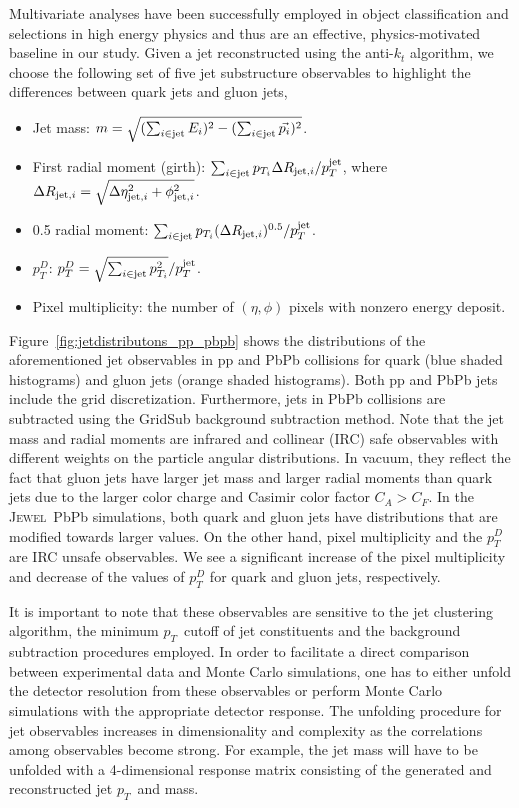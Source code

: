 \documentclass[notoc,preprintnumbers]{JHEP3}
\newcommand{\pt}{$p_{T}$}
\newcommand{\jw}{\textsc{Jewel}~}
\begin{document}
Multivariate analyses have been successfully employed in object classification and selections in high energy physics \cite{Bhat:2010zz, 1742-6596-608-1-012058} and thus are an effective, physics-motivated baseline in our study. Given a jet reconstructed using the anti-$k_{t}$ algorithm, we choose the following set of five jet substructure observables \cite{Gallicchio:2012ez} to highlight the differences between quark jets and gluon jets,
	\begin{itemize}
		\item Jet mass: $m = \sqrt{(\sum_{i\in {\rm jet}} E_i)^{2} - (\sum_{i\in {\rm jet}} \vec{p_i})^2}$.
	        \item First radial moment (girth): $\sum_{i \in {\rm jet}} p_{T_i} \Delta R_{{\rm jet}, i}/p^{\rm jet}_{T}$, where $\Delta R_{{\rm jet}, i}=\sqrt{\Delta \eta^2_{{\rm jet}, i}+\phi^2_{{\rm jet}, i}}$.
		\item 0.5 radial moment:  $\sum_{i \in {\rm jet}} p_{T_i} (\Delta R_{{\rm jet}, i})^{0.5}/p^{\rm jet}_{T}$.
        		\item $p_{T}^{D}$: $p^{D}_{T} = \sqrt{\sum_{i \in {\rm jet}} {p^2_{T_i}}}/p^{\rm jet}_{T}$.
       		\item Pixel multiplicity: the number of $(\eta,\phi)$ pixels with nonzero energy deposit.
	\end{itemize}

Figure~\ref{fig:jetdistributons_pp_pbpb} shows the distributions of the aforementioned jet observables in pp and PbPb collisions for quark (blue shaded histograms) and gluon jets (orange shaded histograms). Both pp and PbPb jets include the grid discretization. Furthermore, jets in PbPb collisions are subtracted using the GridSub background subtraction method. Note that the jet mass and radial moments are infrared and collinear (IRC) safe observables with different weights on the particle angular distributions. In vacuum, they reflect the fact that gluon jets have larger jet mass and larger radial moments than quark jets due to the larger color charge and Casimir color factor $C_A>C_F$. In the \jw PbPb simulations, both quark and gluon jets have distributions that are modified towards larger values. On the other hand, pixel multiplicity and the $p_T^D$ are IRC unsafe observables. We see a significant increase of the pixel multiplicity and decrease of the values of $p_T^D$ for quark and gluon jets, respectively.

It is important to note that these observables are sensitive to the jet clustering algorithm, the minimum \pt ~cutoff of jet constituents and the background subtraction procedures employed. In order to facilitate a direct comparison between experimental data and Monte Carlo simulations, one has to either unfold the detector resolution from these observables or perform Monte Carlo simulations with the appropriate detector response. The unfolding procedure for jet observables increases in dimensionality and complexity as the correlations among observables become strong. For example, the jet mass will have to be unfolded with a 4-dimensional response matrix consisting of the generated and reconstructed jet \pt ~and mass.
\end{document}
